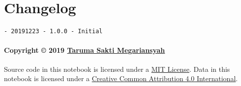 \documentclass[11pt]{article}
\begin{document}
    \hypertarget{changelog}{%
\section{Changelog}\label{changelog}}

\begin{verbatim}
- 20191223 - 1.0.0 - Initial
\end{verbatim}

\hypertarget{copyright-2019-taruma-sakti-megariansyah}{%
\paragraph{\texorpdfstring{Copyright © 2019
\href{https://taruma.github.io}{Taruma Sakti
Megariansyah}}{Copyright © 2019 Taruma Sakti Megariansyah}}\label{copyright-2019-taruma-sakti-megariansyah}}

Source code in this notebook is licensed under a
\href{https://choosealicense.com/licenses/mit/}{MIT License}. Data in
this notebook is licensed under a
\href{https://creativecommons.org/licenses/by/4.0/}{Creative Common
Attribution 4.0 International}.


    
    
    
\end{document}
